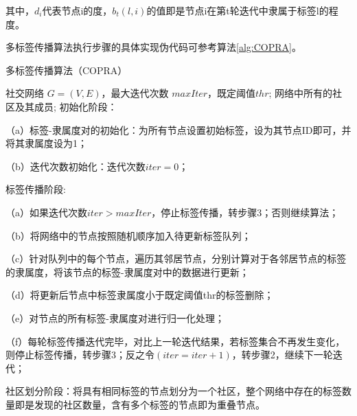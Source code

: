 其中，$d_i$代表节点i的度，$b_t(l,i)$的值即是节点i在第t轮迭代中隶属于标签l的程度。

多标签传播算法执行步骤的具体实现伪代码可参考算法\ref{alg:COPRA}。

\begin{algorithm}[htb]  
  \caption{多标签传播算法（COPRA）}  
  \label{alg:COPRA}  
  \begin{algorithmic}[1]  
    \Require  
      社交网络 $G = (V, E)$，最大迭代次数 $maxIter$，既定阈值$thr$;
    \Ensure  
      网络中所有的社区及其成员;  
    \State 初始化阶段：
    
    （a）标签-隶属度对的初始化：为所有节点设置初始标签，设为其节点ID即可，并将其隶属度设为1；

    （b）迭代次数初始化：迭代次数$iter = 0$；
    

    \State 标签传播阶段:

      （a）如果迭代次数$iter > maxIter$，停止标签传播，转步骤3；否则继续算法；
  
      （b）将网络中的节点按照随机顺序加入待更新标签队列；

      （c）针对队列中的每个节点，遍历其邻居节点，分别计算对于各邻居节点的标签的隶属度，将该节点的标签-隶属度对中的数据进行更新；

      （d）将更新后节点中标签隶属度小于既定阈值thr的标签删除；

      （e）对节点的所有标签-隶属度对进行归一化处理；

      （f）每轮标签传播迭代完毕，对比上一轮迭代结果，若标签集合不再发生变化，则停止标签传播，转步骤3；反之令$(iter = iter+ 1)$，转步骤2，继续下一轮迭代；

     

    \State 社区划分阶段：将具有相同标签的节点划分为一个社区，整个网络中存在的标签数量即是发现的社区数量，含有多个标签的节点即为重叠节点。
  \end{algorithmic}  
\end{algorithm} 

